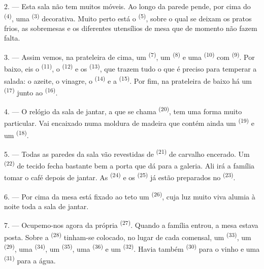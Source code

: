 2. --- Esta sala não tem muitos móveis. Ao longo da parede pende, por
cima do  \textsuperscript{(4)}, uma 
\textsuperscript{(3)} decorativa. Muito perto está o 
\textsuperscript{(5)}, sobre o qual se deixam os pratos frios, as sobremesas e
os diferentes utensílios de mesa que de momento não fazem falta.

3. --- Assim vemos, na prateleira de cima, um 
\textsuperscript{(7)}, um  \textsuperscript{(8)} e uma 
\textsuperscript{(10)} com  \textsuperscript{(9)}. Por baixo, eis o
 \textsuperscript{(11)}, o  \textsuperscript{(12)} e os
 \textsuperscript{(13)}, que trazem tudo o que é preciso para
temperar a salada: o azeite, o vinagre, o  \textsuperscript{(14)} e a
 \textsuperscript{(15)}. Por fim, na prateleira de baixo há um
 \textsuperscript{(17)} junto ao 
\textsuperscript{(16)}.

4. --- O relógio da sala de jantar, a que se chama  \textsuperscript{(20)}, tem uma forma muito particular. Vai encaixado
numa moldura de madeira que contém ainda um 
\textsuperscript{(19)} e um  \textsuperscript{(18)}.

\VUsaut{4.6mm}
\VUsaut{3.0mm}

5. --- Todas as paredes da sala vão revestidas de  \textsuperscript{(21)} de carvalho encerado. Um 
\textsuperscript{(22)} de tecido fecha bastante bem a porta que dá para a
galeria. Ali irá a família tomar o café depois de jantar. As
 \textsuperscript{(24)} e os  \textsuperscript{(25)} já
estão preparados no  \textsuperscript{(23)}.

6. --- Por cima da mesa está fixado ao teto um  \textsuperscript{(26)}, cuja luz muito viva alumia à noite toda a
sala de jantar.

7. --- Ocupemo-nos agora da própria 
\textsuperscript{(27)}. Quando a família entrou, a mesa estava posta. Sobre a
 \textsuperscript{(28)} tinham-se colocado, no lugar de cada
comensal, um  \textsuperscript{(33)}, um 
\textsuperscript{(29)}, uma  \textsuperscript{(34)}, um 
\textsuperscript{(35)}, uma  \textsuperscript{(36)} e um 
\textsuperscript{(32)}. Havia também  \textsuperscript{(30)} para o
vinho e uma  \textsuperscript{(31)} para a água.

